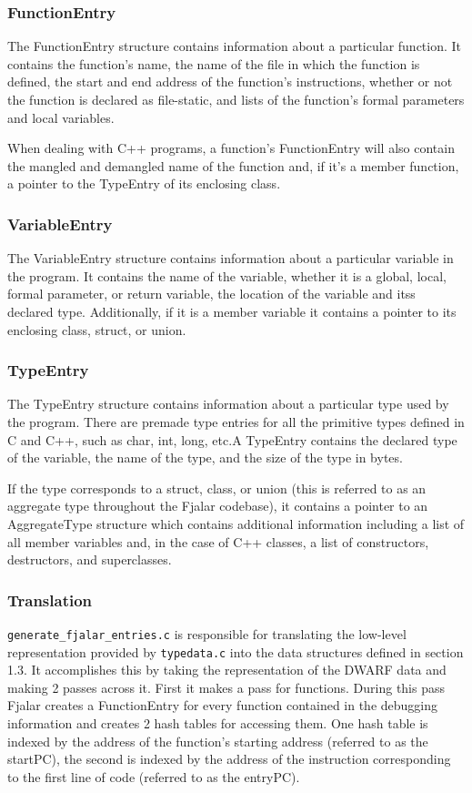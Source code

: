 \documentclass[11pt]{article}
\begin{document}
\subsubsection{FunctionEntry}
The FunctionEntry structure contains information about a particular
function. It contains the function's name, the name of the file in which  
the function is defined, the start and end address of the function's 
instructions, whether or not the function is declared as file-static,
and lists of the function's formal parameters and local variables. 

When dealing with C++ programs, a function's FunctionEntry will also  
contain the mangled and demangled name of the function and, if it's a
member function, a pointer to the TypeEntry of its enclosing class.

\subsubsection{VariableEntry}
The VariableEntry structure contains information about a particular
variable in the program. It contains the name of the variable, whether
it is a global, local, formal parameter, or return variable, the
location of the variable and itss declared type. Additionally,
if it is a member variable it contains a pointer to its enclosing
class, struct, or union.

\subsubsection{TypeEntry}
The TypeEntry structure contains information about a particular type used
by the program. There are premade type entries for all the primitive
types defined in C and C++, such as char, int, long, etc.A TypeEntry
contains  the
declared type of the variable, the name of the type, and the size of
the type in bytes.

If the type corresponds to a struct, class, or union (this is referred to
as an aggregate type throughout the Fjalar codebase), it contains a pointer
to an AggregateType structure which contains additional information
including a list of all member variables and, in the case of C++
classes, a list of constructors, destructors, and superclasses.

\subsubsection{Translation}
\texttt{generate\_fjalar\_entries.c} is responsible for translating
the low-level representation provided by \texttt{typedata.c} into the
data structures defined in section 1.3. It
accomplishes this by taking the representation of the DWARF data and
making 2 passes across it. First it makes a pass for functions. During
this pass Fjalar creates a FunctionEntry for every function contained
in the debugging information and creates 2 hash tables for accessing
them. One hash table is indexed by the address of the function's
starting address (referred to as the startPC), the second is indexed
by the address of the instruction corresponding to the first line of
code (referred to as the entryPC).
\end{document}

